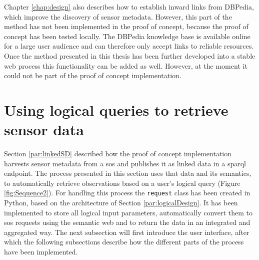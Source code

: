 Chapter \ref{chap:design} also describes how to establish inward links from DBPedia, which improve the discovery of sensor metadata. However, this part of the method has not been implemented in the proof of concept, because the proof of concept has been tested locally. The DBPedia knowledge base is available online for a large user audience and can therefore only accept links to reliable resources. Once the method presented in this thesis has been further developed into a stable web process this functionality can be added as well. However, at the moment it could not be part of the proof of concept implementation.  

\section{Using logical queries to retrieve sensor data}
\label{par:logicalQuery}
Section \ref{par:linkedSD} described how the proof of concept implementation harvests sensor metadata from a \ac{sos} and publishes it as linked data in a \ac{sparql} endpoint. The process presented in this section uses that data and its semantics, to automatically retrieve observations based on a user's logical query (Figure \ref{fig:Sequence2}). For handling this process the \texttt{request} class has been created in Python, based on the architecture of Section \ref{par:logicalDesign}. It has been implemented to store all logical input parameters, automatically convert them to \ac{sos} requests using the semantic web and to return the data in an integrated and aggregated way. The next subsection will first introduce the user interface, after which the following subsections describe how the different parts of the process have been implemented.

